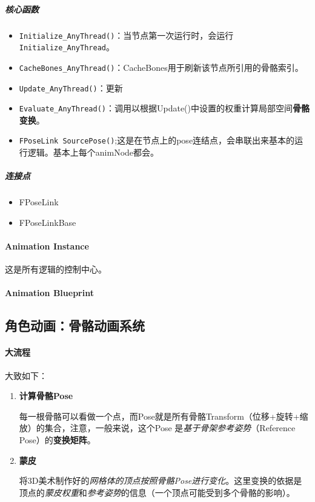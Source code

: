 \documentclass[UTF8,a4paper,12pt]{ctexbook}
\begin{document}
					
				\subparagraph{核心函数}
				
					\begin{itemize}
						\item \verb|Initialize_AnyThread()|：当节点第一次运行时，会运行\verb|Initialize_AnyThread|。
						\item \verb|CacheBones_AnyThread()|：CacheBones用于刷新该节点所引用的骨骼索引。
						\item \verb|Update_AnyThread()|：更新
						\item \verb|Evaluate_AnyThread()|：调用以根据Update()中设置的权重计算局部空间\textbf{骨骼变换}。
						\item \verb|FPoseLink SourcePose()|;这是在节点上的pose连结点，会串联出来基本的运行逻辑。基本上每个animNode都会。
					\end{itemize}		
					
				
				\subparagraph{连接点}
					\begin{itemize}
						\item FPoseLink
						\item FPoseLinkBase
					\end{itemize}
					
						
						
			
			
			\paragraph{Animation Instance}
				这是所有逻辑的控制中心。
			
			
			
			\paragraph{Animation Blueprint}
			
			
			
			
		\subsection{角色动画：骨骼动画系统}
			
			\paragraph{大流程}
				大致如下：
				
				\begin{enumerate}
					\item \textbf{计算骨骼Pose}
						
						每一根骨骼可以看做一个点，而Pose就是所有骨骼Transform（位移+旋转+缩放）的集合，注意，一般来说，这个Pose 是\textit{基于骨架参考姿势}（Reference Pose）的\textbf{变换矩阵}。
					\item \textbf{蒙皮}
					
						将3D美术制作好的\textit{网格体的顶点按照骨骼Pose进行变化}。这里变换的依据是顶点的\textit{蒙皮权重}和\textit{参考姿势}的信息（一个顶点可能受到多个骨骼的影响）。
				\end{enumerate}
				
\end{document}
